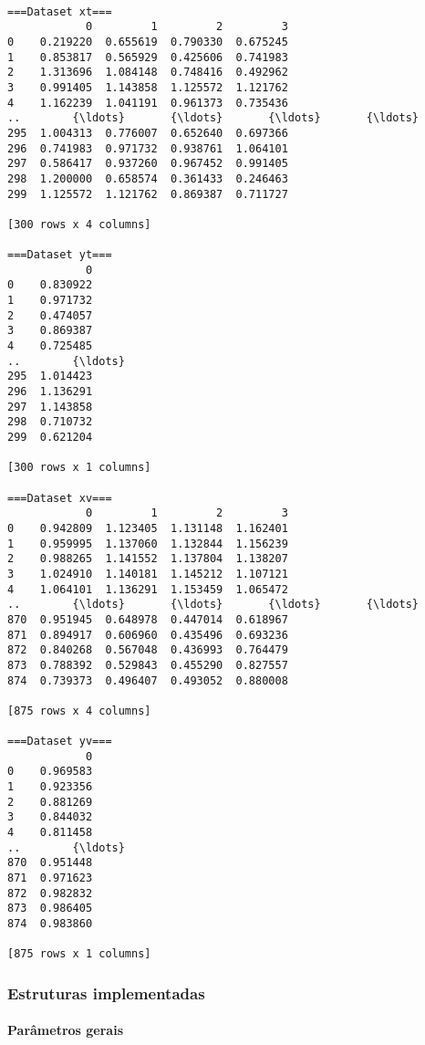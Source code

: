 \documentclass[11pt]{article}
\begin{document}
    \begin{Verbatim}[commandchars=\\\{\}]

===Dataset xt===
            0         1         2         3
0    0.219220  0.655619  0.790330  0.675245
1    0.853817  0.565929  0.425606  0.741983
2    1.313696  1.084148  0.748416  0.492962
3    0.991405  1.143858  1.125572  1.121762
4    1.162239  1.041191  0.961373  0.735436
..        {\ldots}       {\ldots}       {\ldots}       {\ldots}
295  1.004313  0.776007  0.652640  0.697366
296  0.741983  0.971732  0.938761  1.064101
297  0.586417  0.937260  0.967452  0.991405
298  1.200000  0.658574  0.361433  0.246463
299  1.125572  1.121762  0.869387  0.711727

[300 rows x 4 columns]

===Dataset yt===
            0
0    0.830922
1    0.971732
2    0.474057
3    0.869387
4    0.725485
..        {\ldots}
295  1.014423
296  1.136291
297  1.143858
298  0.710732
299  0.621204

[300 rows x 1 columns]

===Dataset xv===
            0         1         2         3
0    0.942809  1.123405  1.131148  1.162401
1    0.959995  1.137060  1.132844  1.156239
2    0.988265  1.141552  1.137804  1.138207
3    1.024910  1.140181  1.145212  1.107121
4    1.064101  1.136291  1.153459  1.065472
..        {\ldots}       {\ldots}       {\ldots}       {\ldots}
870  0.951945  0.648978  0.447014  0.618967
871  0.894917  0.606960  0.435496  0.693236
872  0.840268  0.567048  0.436993  0.764479
873  0.788392  0.529843  0.455290  0.827557
874  0.739373  0.496407  0.493052  0.880008

[875 rows x 4 columns]

===Dataset yv===
            0
0    0.969583
1    0.923356
2    0.881269
3    0.844032
4    0.811458
..        {\ldots}
870  0.951448
871  0.971623
872  0.982832
873  0.986405
874  0.983860

[875 rows x 1 columns]
    \end{Verbatim}

    \hypertarget{estruturas-implementadas}{%
\subsubsection{Estruturas
implementadas}\label{estruturas-implementadas}}

    \hypertarget{paruxe2metros-gerais}{%
\paragraph{Parâmetros gerais}\label{paruxe2metros-gerais}}
\end{document}
